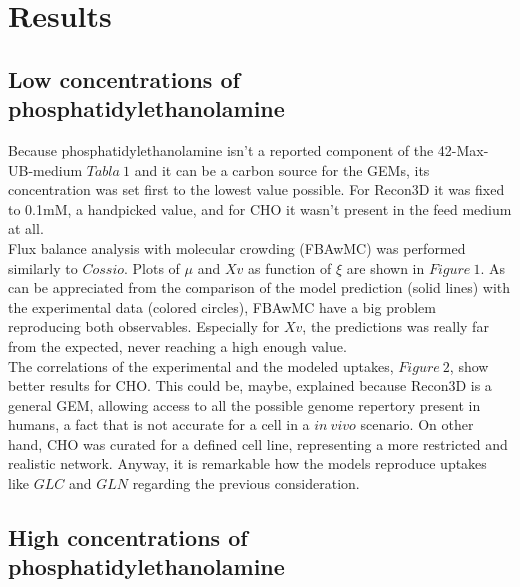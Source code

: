 \documentclass[]{article}
\begin{document}
	
	
	\section{Results} %
	
	\subsection{Low concentrations of phosphatidylethanolamine} %
	
	Because phosphatidylethanolamine isn't a reported component of the 42-Max-UB-medium $Tabla\ 1$ and it can be a carbon source for the GEMs, its concentration was set first to the lowest value possible. For Recon3D it was fixed to 0.1mM, a handpicked value, and for CHO it wasn't present in the feed medium at all.\\ 
	Flux balance analysis with molecular crowding (FBAwMC) was performed similarly to $Cossio$. Plots of $\mu$ and $Xv$ as function of $\xi$ are shown in $Figure\ 1$. As can be appreciated from the comparison of the model prediction (solid lines) with the experimental data (colored circles), FBAwMC have a big problem reproducing both observables. Especially for $Xv$, the predictions was really far from the expected, never reaching a high enough value.\\
	The correlations of the experimental and the modeled uptakes, $Figure\ 2$, show better results for CHO. This could be, maybe, explained because Recon3D is a general GEM, allowing access to all the possible genome repertory present in humans, a fact that is not accurate for a cell in a $in\ vivo$ scenario. On other hand, CHO was curated for a defined cell line, representing a more restricted and realistic network. Anyway, it is remarkable how the models reproduce uptakes like $GLC$ and $GLN$ regarding the previous consideration.
	
	\subsection{High concentrations of phosphatidylethanolamine} %
	
	
	
	
	
	
	
\end{document}
